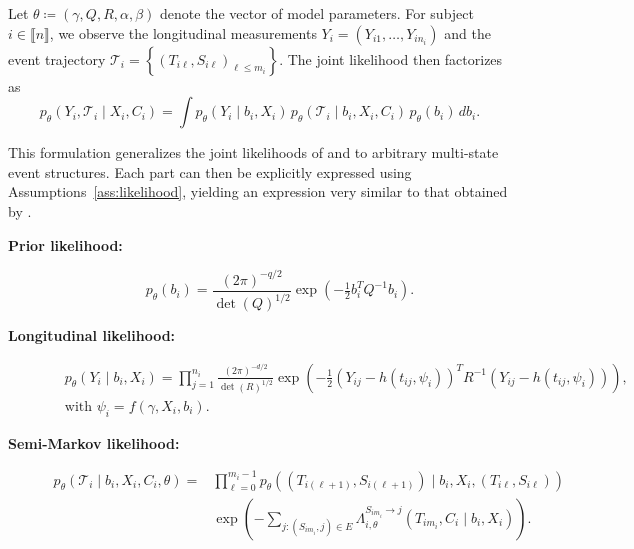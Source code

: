 \documentclass{sn-jnl}
\begin{document}
Let $\theta \coloneqq (\gamma, Q, R, \alpha, \beta)$ denote the vector of model parameters. For subject $i \in \llbracket n \rrbracket$, we observe the longitudinal measurements $Y_i = (Y_{i1}, \dots, Y_{in_i})$ and the event trajectory $\mathcal{T}_i = \left\{ (T_{i\ell}, S_{i\ell})_{\ell \leq m_i} \right\}$. The joint likelihood then factorizes as
\[
    p_\theta(Y_i, \mathcal{T}_i \mid X_i, C_i) = \int p_\theta(Y_i \mid b_i, X_i) \, p_\theta(\mathcal{T}_i \mid b_i, X_i, C_i) \, p_\theta(b_i) \, db_i.
\]

This formulation generalizes the joint likelihoods of \citet{wulfsohn1997joint} and \citet{ferrer2016joint} to arbitrary multi-state event structures. Each part can then be explicitly expressed using Assumptions~\ref{ass:likelihood}, yielding an expression very similar to that obtained by \citet{rizopoulos2012joint}.

\begin{description}
    \item[\textnormal{\textbf{Prior likelihood:}}]
        \[
            p_\theta(b_i) = \frac{(2 \pi)^{-q/2}}{\det(Q)^{1/2}}
              \exp\left( -\tfrac{1}{2} b_i^T Q^{-1} b_i \right).
        \]

    \item[\textnormal{\textbf{Longitudinal likelihood:}}]
        \begin{align*}
           &p_\theta(Y_i \mid b_i, X_i) = \prod_{j = 1}^{n_i} \frac{(2 \pi)^{-d/2}}{\det(R)^{1/2}} \exp\left( -\tfrac{1}{2} \left(Y_{ij} - h(t_{ij}, \psi_i) \right)^T R^{-1} \left( Y_{ij} - h(t_{ij}, \psi_i) \right) \right), \\
           &\text{with } \psi_i = f(\gamma, X_i, b_i).
        \end{align*}

    \item[\textnormal{\textbf{Semi-Markov likelihood:}}]
          \begin{equation}
              \begin{aligned}
                  p_\theta(\mathcal{T}_i \mid b_i, X_i, C_i, \theta) = &\prod_{\ell=0}^{m_i-1} p_\theta\left((T_{i(\ell+1)}, S_{i(\ell+1)}) \mid b_i, X_i, (T_{i\ell}, S_{i\ell}) \right) \\
     &\exp\left( -\sum_{j: (S_{im_i}, j) \in E} \Lambda_{i, \theta}^{S_{im_i} \to j} (T_{im_i}, C_i \mid b_i, X_i) \right).
              \end{aligned}
              \label{eq:semi-markov}
          \end{equation}
\end{description}
\end{document}
